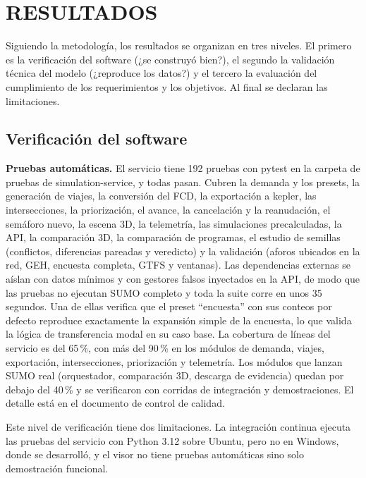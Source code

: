 \setcounter{subsection}{0}
\section{RESULTADOS}

Siguiendo la metodología, los resultados se organizan en tres niveles. El primero es la verificación del software (¿se construyó bien?), el segundo la validación técnica del modelo (¿reproduce los datos?) y el tercero la evaluación del cumplimiento de los requerimientos y los objetivos. Al final se declaran las limitaciones.

\subsection{Verificación del software}
\label{sec:verificacion}

\textbf{Pruebas automáticas.} El servicio tiene 192 pruebas con pytest en la carpeta de pruebas de simulation-service, y todas pasan. Cubren la demanda y los presets, la generación de viajes, la conversión del FCD, la exportación a kepler, las intersecciones, la priorización, el avance, la cancelación y la reanudación, el semáforo nuevo, la escena 3D, la telemetría, las simulaciones precalculadas, la API, la comparación 3D, la comparación de programas, el estudio de semillas (conflictos, diferencias pareadas y veredicto) y la validación (aforos ubicados en la red, GEH, encuesta completa, GTFS y ventanas). Las dependencias externas se aíslan con datos mínimos y con gestores falsos inyectados en la API, de modo que las pruebas no ejecutan SUMO completo y toda la suite corre en unos 35 segundos. Una de ellas verifica que el preset “encuesta” con sus conteos por defecto reproduce exactamente la expansión simple de la encuesta, lo que valida la lógica de transferencia modal en su caso base. La cobertura de líneas del servicio es del 65\,\%, con más del 90\,\% en los módulos de demanda, viajes, exportación, intersecciones, priorización y telemetría. Los módulos que lanzan SUMO real (orquestador, comparación 3D, descarga de evidencia) quedan por debajo del 40\,\% y se verificaron con corridas de integración y demostraciones. El detalle está en el documento de control de calidad.

Este nivel de verificación tiene dos limitaciones. La integración continua ejecuta las pruebas del servicio con Python 3.12 sobre Ubuntu, pero no en Windows, donde se desarrolló, y el visor no tiene pruebas automáticas sino solo demostración funcional.

